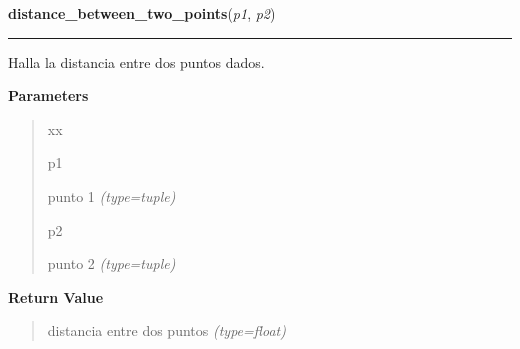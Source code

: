 \hspace{.8\funcindent}\begin{boxedminipage}{\funcwidth}

    \raggedright \textbf{distance\_between\_two\_points}(\textit{p1}, \textit{p2})

    \vspace{-1.5ex}

    \rule{\textwidth}{0.5\fboxrule}
\setlength{\parskip}{2ex}
Halla la distancia entre dos puntos dados.

\setlength{\parskip}{1ex}
      \textbf{Parameters}
      \vspace{-1ex}

      \begin{quote}
        \begin{Ventry}{xx}

          \item[p1]


punto 1
            {\it (type=tuple)}

          \item[p2]


punto 2
            {\it (type=tuple)}

        \end{Ventry}

      \end{quote}

      \textbf{Return Value}
    \vspace{-1ex}

      \begin{quote}

distancia entre dos puntos
      {\it (type=float)}

      \end{quote}

    \end{boxedminipage}

    \label{src:functions:direction_between_two_points}

    \vspace{0.5ex}


